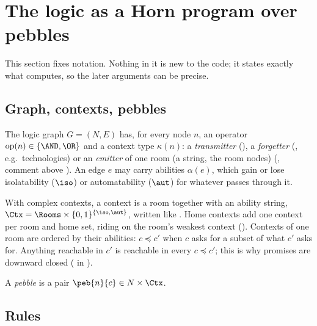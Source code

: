 \section{The logic as a Horn program over pebbles}\label{sec:model}

This section fixes notation. Nothing in it is new to the code; it states exactly what  computes, so the later arguments can be precise.

\subsection{Graph, contexts, pebbles}

The logic graph $G=(N,E)$ has, for every node $n$, an operator $\mathrm{op}(n)\in\{\AND,\OR\}$ and a context type $\kappa(n)$: a \emph{transmitter} (), a \emph{forgetter} (, e.g.\ technologies) or an \emph{emitter} of one room (a string, the room nodes) (, comment above ). An edge $e$ may carry abilities $\alpha(e)$, which gain or lose isolatability ($\iso$) or automatability ($\aut$) for whatever passes through it.

With complex contexts, a context is a room together with an ability string, $\Ctx=\Rooms\times\{0,1\}^{\{\iso,\aut\}}$, written like . Home contexts add one context per room and home set, riding on the room's weakest context (). Contexts of one room are ordered by their abilities: $c\preceq c'$ when $c$ asks for a subset of what $c'$ asks for. Anything reachable in $c'$ is reachable in every $c\preceq c'$; this is why promises are downward closed ( in ).

A \emph{pebble} is a pair $\peb{n}{c}\in N\times\Ctx$.

\subsection{Rules}

